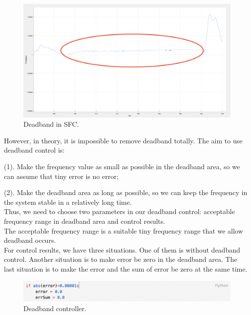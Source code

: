 \begin{figure}[!htbp]
\center
\includegraphics[scale=0.3]{figure/3_3_deadband.png}
\caption{Deadband in SFC.}
\label{3_3_deadband}
\end{figure}


However, in theory, it is impossible to remove deadband totally. The aim to use deadband control is: 
	
    (1). Make the frequency value as small as possible in the deadband area, so we can assume that tiny error is no error;
    
	(2). Make the deadband area as long as possible, so we can keep the frequency in the system stable in a relatively long time. \\

Thus, we need to choose two parameters in our deadband control: acceptable frequency range in deadband area and control results. \\

The acceptable frequency range is a suitable tiny frequency range that we allow deadband occurs.\\

For control results, we have three situations. One of them is without deadband control. Another situation is to make error be zero in the deadband area. The last situation is to make the error and the sum of error be zero at the same time.\\

\begin{figure}[htbp]
\center
\includegraphics[scale=0.65]{figure/3_3_deadband_code.png}
\caption{Deadband controller.}
\label{3_3_deadband_code}
\end{figure}

